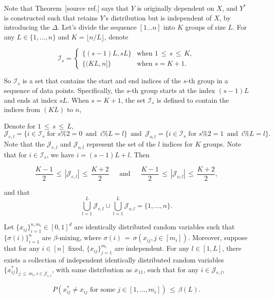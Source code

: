 \documentclass[twoside,11pt]{article}
\makeatletter
\newcommand{\discardlabel}[1]{}
\newcommand{\discardtwo}[2]{}
\newcommand{\legacyref}[1]{\textup{[source ref.]}}
\newcommand{\legacyeqref}[1]{\textup{[source equation]}}
\newenvironment{legacycomparison}{%
  \begingroup\color{legacygray}%
  \let\label\discardlabel
  \let\originallabel\discardlabel
  \let\ref\legacyref
  \let\pageref\legacyref
  \let\eqref\legacyeqref
  \let\cref\legacyref
  \let\Cref\legacyref
  \let\autoref\legacyref
  \let\aliasref\discardtwo
}{\endgroup}
\newcommand{\aliasref}[2]{%
  \@ifundefined{r@#2}{}{%
    \expandafter\let\csname r@#1\expandafter\endcsname\csname r@#2\endcsname}}
\makeatother
\begin{document}
\begin{legacycomparison}
Note that Theorem~\ref{thm_beta_mix} says that \(Y\) is originally dependent on \(X\), and \(Y^*\) is constructed such that retains \(Y\)'s distribution but is independent of \(X\), by introducing the \(\Delta\). 
Let's divide the sequence $[1\dots n]$ into $K$ groups of size $L$. For any \(L \in \{1, \ldots, n\}\) and \(K = \lfloor n/L \rfloor\), denote

\[
\mathcal{I}_s = 
\begin{cases}
\{ (s - 1)L, sL \} & \text{when } 1 \,\leq\, s \,\leq\, K, \\
\{ (KL, n] \} & \text{when } s = K + 1.
\end{cases}
\]

So $\mathcal{I}_s$ is a set that contains the start and end indices of the 
$s$-th group in a sequence of data points. Specifically, the 
$s$-th group starts at the index 
$(s-1)L$ and ends at index 
$sL$. When \(s = K + 1\), the set \(\mathcal{I}_s\) is defined to contain the indices from \((KL)\) to \(n\),

Denote for \(1 \,\leq\, s \,\leq\, L\),
\[
\mathcal{J}_{e, l} = \{i \in \mathcal{I}_s \text{ for } s\%2 = 0 \,\,\,\text{and}\,\,\, i\%L = l\} \,\,\,\text{and}\,\,\, \mathcal{J}_{o, l} = \{i \in \mathcal{I}_s \text{ for } s\%2 = 1 \,\,\,\text{and}\,\,\, i\%L = l\}.
\]
Note that the $\mathcal{J}_{e, l}$ and $\mathcal{J}_{o, l}$ represent the set of the $l$ indices for $K$ groups. 
Note that for $i\in \mathcal{I}_s$, we have 
$i = (s-1)L + l$.
Then

\[
\frac{K - 1}{2} \,\leq\, |\mathcal{J}_{e, l}| \,\leq\, \frac{K + 2}{2} \quad \,\,\,\text{and}\,\,\, \quad \frac{K - 1}{2} \,\leq\, |\mathcal{J}_{o, l}| \,\leq\, \frac{K + 2}{2},
\]

and that
\[
\bigcup_{l=1}^L \mathcal{J}_{e,l} \cup \bigcup_{l=1}^L \mathcal{J}_{o,l} = \{1, \ldots, n\}.
\]

\begin{lemma}
\label{Lemma_9}  
Let \(\{x_{ij}\}^{n,m_i}_{i=1} \in [0,1]^d\) are identically distributed random variables such that \(\{\sigma(i)\}^{n}_{i=1}\) are \(\beta\)-mixing, where \(\sigma(i) \,=\, \sigma(x_{ij}, j \in [m_i])\). Moreover, suppose that for any \(i \in [n]\) fixed, \(\{x_{ij}\}^{m_i}_{j=1}\) are independent. For any \(l \in [1, L]\), there exists a collection of independent identically distributed random variables \(\{x_{ij}^*\}_{j \,\leq\, m_i, i \in \mathcal{J}_{e,l}}\), with same distribution as \(x_{11}\), such that for any \(i \in \mathcal{J}_{e,l}\),

\[
P(x_{ij}^* \neq x_{ij} \text{ for some } j \in [1, \ldots, m_i]) \,\leq\, \beta(L).
\]


\end{lemma}
\end{legacycomparison}
\end{document}
